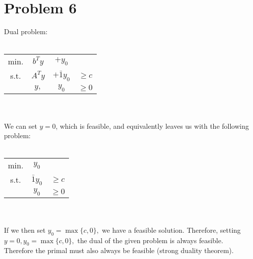 \documentclass[12pt]{article}
\begin{document}
\section*{Problem 6}
Dual problem: \\
\\
\begin{tabular}{c c c c}
    min. & $b^T y$ & $+y_0$ & \\
    s.t. & $A^T y$ & $+\bar{1} y_0$ & $\geq c$ \\
    & $y,$ & $y_0$ & $\geq 0$
\end{tabular} \\
\\
We can set $y = 0$, which is feasible, and equivalently leaves us with the following problem: \\
\\
\begin{tabular}{c c c}
    min. & $y_0$ & \\
    s.t. & $\bar{1} y_0$ & $\geq c$ \\
    & $y_0$ & $\geq 0$
\end{tabular} \\
\\
If we then set $y_0 = \max\{c, 0\},$ we have a feasible solution. Therefore, setting $y = 0, y_0 = \max\{c, 0\},$ the dual of the given problem is always feasible. Therefore the primal must also always be feasible (strong duality theorem).
\end{document}
